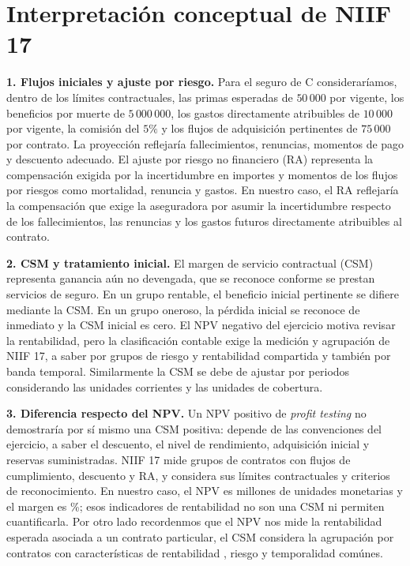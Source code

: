 \section{Interpretación conceptual de NIIF 17}
\label{sec:niif17}


\textbf{1. Flujos iniciales y ajuste por riesgo.}
Para el seguro de C consideraríamos, dentro de los límites contractuales,
las primas esperadas de $50\,000$ por vigente, los beneficios por muerte de
$5\,000\,000$, los gastos directamente atribuibles de $10\,000$ por vigente,
la comisión del $5\%$ y los flujos de adquisición pertinentes de $75\,000$
por contrato. La proyección reflejaría fallecimientos, renuncias, momentos
de pago y descuento adecuado. El ajuste por riesgo no financiero (RA)
representa la compensación exigida por la incertidumbre en importes y
momentos de los flujos por riesgos como mortalidad, renuncia y gastos.
En nuestro caso, el RA reflejaría la compensación que exige la aseguradora por asumir la incertidumbre respecto de los fallecimientos, las renuncias y los gastos futuros directamente atribuibles al contrato.


\textbf{2. CSM y tratamiento inicial.}
El margen de servicio contractual (CSM) representa ganancia aún no devengada,
que se reconoce conforme se prestan servicios de seguro. En un grupo
rentable, el beneficio inicial pertinente se difiere mediante la CSM.
En un grupo oneroso, la pérdida inicial se reconoce de inmediato y la CSM
inicial es cero. El NPV negativo del ejercicio motiva revisar la rentabilidad,
pero la clasificación contable exige la medición y agrupación de NIIF 17, a saber por grupos de riesgo
 y rentabilidad compartida y también por banda temporal. Similarmente la CSM se debe de ajustar por periodos 
 considerando las unidades corrientes y las unidades de cobertura.

\textbf{3. Diferencia respecto del NPV.}
Un NPV positivo de \emph{profit testing} no demostraría por sí mismo una CSM
positiva: depende de las convenciones del ejercicio, a saber el descuento, el nivel de rendimiento, 
adquisición inicial y reservas suministradas. NIIF 17 mide grupos de contratos con flujos de cumplimiento, descuento y RA,
y considera sus límites contractuales y criterios de reconocimiento.
En nuestro caso, el NPV es \NPVbaseF{} millones de unidades monetarias y el
margen es \MargenbaseF{}\%; esos indicadores de rentabilidad no son una CSM
ni permiten cuantificarla. Por otro lado recordenmos que el NPV nos mide la rentabilidad esperada asociada a un contrato particular, el CSM considera la 
agrupación por contratos con características de rentabilidad , riesgo y temporalidad comúnes.

